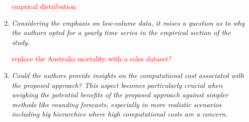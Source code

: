 \documentclass[11pt,a4paper]{article}
\begin{document}
\begin{enumerate}
  \textcolor{red}{emprical distribution}
  
  \item \textit{Considering the emphasis on low-volume data, it raises a question as to why the authors opted for a yearly time series in the empirical section of the study.}
  
  \textcolor{red}{replace the Australia mortality with a sales dataset?}
  
  \item \textit{Could the authors provide insights on the computational cost associated with the proposed approach? This aspect becomes particularly crucial when weighing the potential benefits of the proposed approach against simpler methods like rounding forecasts, especially in more realistic scenarios including big hierarchies where high computational costs are a concern.}


\end{enumerate}

% 
% 
\printbibliography
\end{document}
